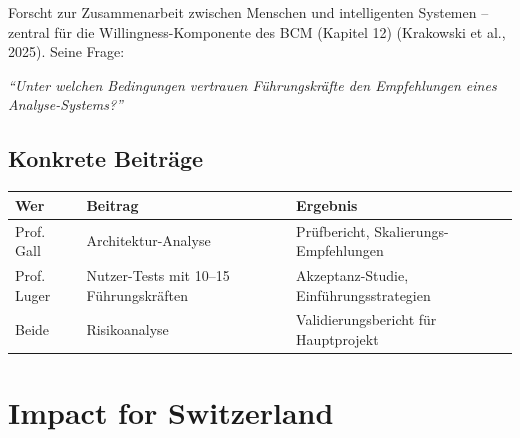 \documentclass[11pt,a4paper]{article}
\begin{document}
Forscht zur Zusammenarbeit zwischen Menschen und intelligenten Systemen -- zentral für die Willingness-Komponente des BCM (Kapitel 12) (Krakowski et al., 2025). Seine Frage:

\textit{``Unter welchen Bedingungen vertrauen Führungskräfte den Empfehlungen eines Analyse-Systems?''}

\subsection{Konkrete Beiträge}

\begin{table}[h]
\centering
\begin{tabular}{@{}L{3cm}L{5cm}L{5cm}@{}}
\toprule
\textbf{Wer} & \textbf{Beitrag} & \textbf{Ergebnis} \\
\midrule
Prof. Gall & Architektur-Analyse & Prüfbericht, Skalierungs-Empfehlungen \\
Prof. Luger & Nutzer-Tests mit 10--15 Führungskräften & Akzeptanz-Studie, Einführungsstrategien \\
Beide & Risikoanalyse & Validierungsbericht für Hauptprojekt \\
\bottomrule
\end{tabular}
\end{table}

\vspace{1cm}

\newpage


\section{Impact for Switzerland}
\end{document}
